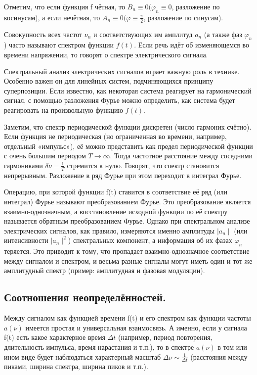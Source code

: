 \documentclass[a4paper,12pt]{article}
\begin{document}
Отметим, что если функция f чётная, то $B_n \equiv 0 (\varphi_n \equiv 0$, разложение по косинусам), а если нечётная, то $A_n \equiv 0(\varphi \equiv \frac{\pi}{2}$, разложение по синусам).

Совокупность всех частот $\nu_n$ и соответствующих им амплитуд $a_n$ (а также
фаз $\varphi_n$) часто называют спектром функции $f(t)$. Если речь идёт об изменяющемся во времени напряжении, то говорят о спектре электрического сигнала.

Спектральный анализ электрических сигналов играет важную роль в технике. Особенно важен он для линейных систем, подчиняющихся принципу суперпозиции. Если известно, как некоторая система реагирует на гармонический сигнал, с помощью разложения Фурье можно определить, как система будет реагировать на произвольную функцию $f(t)$.

Заметим, что спектр периодической функции дискретен (число гармоник
счётно). Если функция не периодическая (но ограниченная во времени,
например, отдельный «импульс»), её можно представить как предел
периодической функции с очень большим периодом $T \rightarrow \infty$. Тогда частотное расстояние между соседними гармониками $\delta \nu = \frac{1}{T}$ стремится к нулю. Говорят, что спектр становится непрерывным. Разложение в ряд Фурье при этом переходит в интеграл Фурье.

Операцию, при которой функции f(t) ставится в соответствие её ряд (или
интеграл) Фурье называют преобразованием Фурье. Это преобразование является взаимно-однозначным, а восстановление исходной функции по её спектру называется обратным преобразованием Фурье. Однако при спектральном
анализе электрических сигналов, как правило, измеряются именно амплитуды $\mid a_n \mid$ (или интенсивности $\mid a_n \mid^2$) спектральных компонент, а информация
об их фазах $\varphi_n$ теряется. Это приводит к тому, что пропадает взаимно-однозначное соответствие между сигналом и спектром, и весьма разные сигналы
могут иметь один и тот же амплитудный спектр (пример: амплитудная и фазовая модуляции).

\subsection*{Соотношения неопределённостей.} 

Между сигналом как функцией времени f(t) и его спектром как функции частоты $a(\nu)$ имеется простая и универсальная взаимосвязь. А именно, если у сигнала f(t) есть какое характерное время $\Delta t$ (например, период повторения, длительность импульса, время нарастания и т.п.), то в спектре $a(\nu)$ в том или ином виде будет наблюдаться
характерный масштаб $\Delta \nu \sim \frac{1}{\Delta t}$ (расстояния между пиками, ширина спектра, ширина пиков и т.п.).
\end{document}
